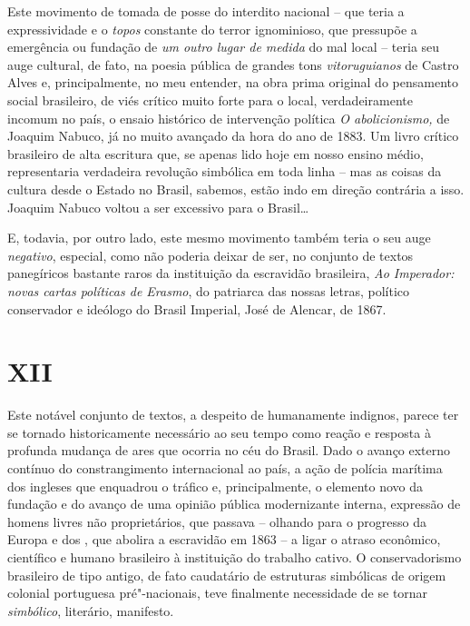 Este movimento de tomada de posse do interdito nacional -- que teria a
expressividade e o \emph{topos} constante do terror ignominioso, que
pressupõe a emergência ou fundação de \emph{um outro lugar de medida} do
mal local -- teria seu auge cultural, de fato, na poesia pública de
grandes tons \emph{vitoruguianos} de Castro Alves e, principalmente, no
meu entender, na obra prima original do pensamento social brasileiro, de
viés crítico muito forte para o local, verdadeiramente incomum no país,
o ensaio histórico de intervenção política \emph{O abolicionismo,} de
Joaquim Nabuco, já no muito avançado da hora do ano de 1883. Um livro
crítico brasileiro de alta escritura que, se apenas lido hoje em nosso
ensino médio, representaria verdadeira revolução simbólica em toda linha
-- mas as coisas da cultura desde o Estado no Brasil, sabemos, estão
indo em direção contrária a isso. Joaquim Nabuco voltou a ser excessivo
para o Brasil\ldots{}

E, todavia, por outro lado, este mesmo movimento também teria o seu auge
\emph{negativo}, especial, como não poderia deixar de ser, no conjunto
de textos panegíricos bastante raros da instituição da escravidão
brasileira, \emph{Ao Imperador: novas cartas políticas de Erasmo}, do
patriarca das nossas letras, político conservador e ideólogo do Brasil
Imperial, José de Alencar, de 1867.

\section{XII}

Este notável conjunto de textos, a despeito de humanamente indignos,
parece ter se tornado historicamente necessário ao seu tempo como reação
e resposta à profunda mudança de ares que ocorria no céu do Brasil. Dado
o avanço externo contínuo do constrangimento internacional ao país, a
ação de polícia marítima dos ingleses que enquadrou o tráfico e,
principalmente, o elemento novo da fundação e do avanço de uma opinião
pública modernizante interna, expressão de homens livres não
proprietários, que passava -- olhando para o progresso da Europa e dos
, que abolira a escravidão em 1863 -- a ligar o atraso econômico,
científico e humano brasileiro à instituição do trabalho cativo. O
conservadorismo brasileiro de tipo antigo, de fato caudatário de
estruturas simbólicas de origem colonial portuguesa pré"-nacionais, teve
finalmente necessidade de se tornar \emph{simbólico}, literário,
manifesto.

